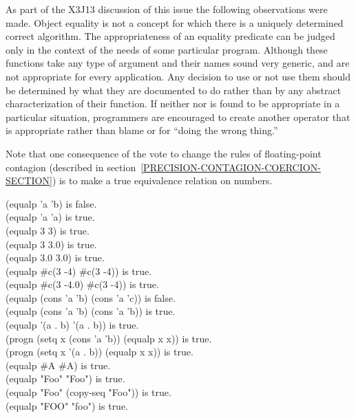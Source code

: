 \begin{defun}[Function]
\begin{new}
As part of the X3J13 discussion of this issue
the following observations were made.
    Object equality is not a concept for which there is a uniquely
    determined correct algorithm. The appropriateness of an equality
    predicate can be judged only in the context of the needs of some
    particular program. Although these functions take any type of
    argument and their names sound very generic,  and  are
    not appropriate for every application. Any decision to use or not
    use them should be determined by what they are documented to do
    rather than by any abstract characterization of their function. If
    neither  nor  is found to be appropriate in a particular
    situation, programmers are encouraged to create another operator
    that is appropriate rather than blame  or  for ``doing
    the wrong thing.''
\end{new}

\begin{new}
Note that one consequence
of the vote to change the rules of
floating-point contagion
(described in section~\ref{PRECISION-CONTAGION-COERCION-SECTION})
is to make 
a true equivalence relation on numbers.
\end{new}

\begin{lisp}
(equalp 'a 'b) \textrm{is false.} \\
(equalp 'a 'a) \textrm{is true.} \\
(equalp 3 3) \textrm{is true.} \\
(equalp 3 3.0) \textrm{is true.} \\
(equalp 3.0 3.0) \textrm{is true.} \\
(equalp \#c(3 -4) \#c(3 -4)) \textrm{is true.} \\
(equalp \#c(3 -4.0) \#c(3 -4)) \textrm{is true.} \\
(equalp (cons 'a 'b) (cons 'a 'c)) \textrm{is false.} \\
(equalp (cons 'a 'b) (cons 'a 'b)) \textrm{is true.} \\
(equalp '(a . b) '(a . b)) \textrm{is true.} \\
(progn (setq x (cons 'a 'b)) (equalp x x)) \textrm{is true.} \\
(progn (setq x '(a . b)) (equalp x x)) \textrm{is true.} \\
(equalp \#{\Xbackslash}A \#{\Xbackslash}A) \textrm{is true.} \\
(equalp "Foo" "Foo") \textrm{is true.} \\
(equalp "Foo" (copy-seq "Foo")) \textrm{is true.} \\
(equalp "FOO" "foo") \textrm{is true.}
\end{lisp}


\end{defun}
